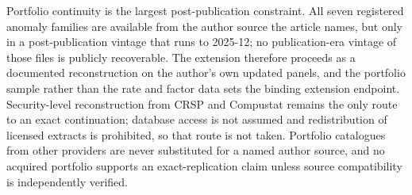 \documentclass[11pt]{article}
\begin{document}
Portfolio continuity is the largest post-publication constraint. All seven
registered anomaly families are available from the author source the article
names, but only in a post-publication vintage that runs to 2025-12; no %
publication-era vintage of those files is publicly recoverable. The extension
therefore proceeds as a documented reconstruction on the author's own updated
panels, and the portfolio sample rather than the rate and factor data sets the
binding extension endpoint. Security-level reconstruction from CRSP and %
Compustat remains the only route to an exact continuation; database access is
not assumed and redistribution of licensed extracts is prohibited, so that route %
is not taken. %
Portfolio catalogues from other providers are never substituted for a named
author source, and no acquired portfolio supports an exact-replication claim
unless source compatibility is independently verified.
\end{document}
